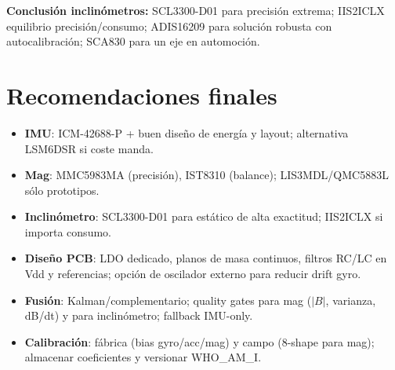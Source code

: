 \documentclass[11pt,a4paper]{article}
\begin{document}
\textbf{Conclusión inclinómetros:} SCL3300-D01 para precisión extrema; IIS2ICLX equilibrio precisión/consumo; ADIS16209 para solución robusta con autocalibración; SCA830 para un eje en automoción.

\section{Recomendaciones finales}
\begin{itemize}[leftmargin=12pt]
  \item \textbf{IMU}: ICM-42688-P + buen dise\~no de energ\'ia y layout; alternativa LSM6DSR si coste manda.
  \item \textbf{Mag}: MMC5983MA (precisi\'on), IST8310 (balance); LIS3MDL/QMC5883L s\'olo prototipos.
  \item \textbf{Inclin\'ometro}: SCL3300-D01 para est\'atico de alta exactitud; IIS2ICLX si importa consumo.
  \item \textbf{Dise\~no PCB}: LDO dedicado, planos de masa continuos, filtros RC/LC en Vdd y referencias; opci\'on de oscilador externo para reducir drift gyro.
  \item \textbf{Fusi\'on}: Kalman/complementario; quality gates para mag ($|B|$, varianza, dB/dt) y para inclin\'ometro; fallback IMU-only.
  \item \textbf{Calibraci\'on}: f\'abrica (bias gyro/acc/mag) y campo (8-shape para mag); almacenar coeficientes y versionar WHO\_AM\_I.
\end{itemize}
\end{document}
